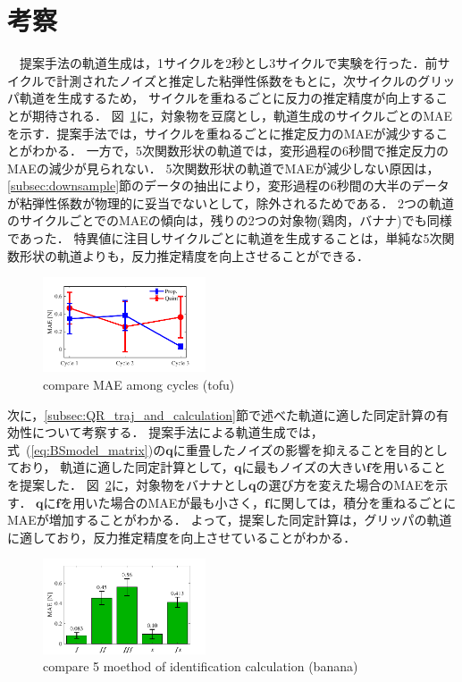 \documentclass[a4paper]{jarticle}
\begin{document}
\section{考察}
　提案手法の軌道生成は，1サイクルを2秒とし3サイクルで実験を行った．前サイクルで計測されたノイズと推定した粘弾性係数をもとに，次サイクルのグリッパ軌道を生成するため，
サイクルを重ねるごとに反力の推定精度が向上することが期待される．
図~\ref{fig:compare_cycle_MAE}に，対象物を豆腐とし，軌道生成のサイクルごとのMAEを示す．提案手法では，サイクルを重ねるごとに推定反力のMAEが減少することがわかる．
一方で，5次関数形状の軌道では，変形過程の6秒間で推定反力のMAEの減少が見られない．
5次関数形状の軌道でMAEが減少しない原因は，\ref{subsec:downsample}節のデータの抽出により，変形過程の6秒間の大半のデータが粘弾性係数が物理的に妥当でないとして，除外されるためである．
2つの軌道のサイクルごとでのMAEの傾向は，残りの2つの対象物(鶏肉，バナナ)でも同様であった．
特異値に注目しサイクルごとに軌道を生成することは，単純な5次関数形状の軌道よりも，反力推定精度を向上させることができる．
\begin{figure}[tb]
    \centering
    \includegraphics[width=0.43\textwidth]{compare_cycle_MAE.pdf}
    \caption{compare MAE among cycles (tofu)}
    \label{fig:compare_cycle_MAE}
\end{figure}

次に，\ref{subsec:QR_traj_and_calculation}節で述べた軌道に適した同定計算の有効性について考察する．
提案手法による軌道生成では，式~(\ref{eq:BSmodel_matrix})の$\mathbf{q}$に重畳したノイズの影響を抑えることを目的としており，
軌道に適した同定計算として，$\mathbf{q}$に最もノイズの大きい$\boldsymbol{f}$を用いることを提案した．
図~\ref{fig:compare_select5mode}に，対象物をバナナとし$\mathbf{q}$の選び方を変えた場合のMAEを示す．
$\mathbf{q}$に$\boldsymbol{f}$を用いた場合のMAEが最も小さく，$\boldsymbol{{f}}$に関しては，積分を重ねるごとにMAEが増加することがわかる．
よって，提案した同定計算は，グリッパの軌道に適しており，反力推定精度を向上させていることがわかる．
\begin{figure}[tb]
    \centering
    \includegraphics[width=0.43\textwidth]{select_differet_q_banana.pdf}
    \captionsetup{width=0.9\linewidth} %
    \caption{compare 5 moethod of identification calculation (banana)}
    \label{fig:compare_select5mode}
\end{figure}
\end{document}
